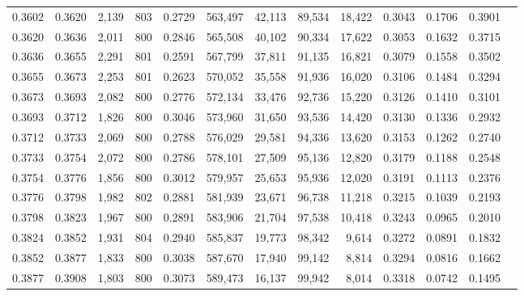 \begin{tabular}{rrrrrrrrrrrrr}
0.3602 & 0.3620 &  2,139 & 803 &                                     0.2729 & 563,497 &  42,113 &  89,534 &  18,422 & 0.3043 & 0.1706 & 0.3901 \\
0.3620 & 0.3636 &  2,011 & 800 &                                     0.2846 & 565,508 &  40,102 &  90,334 &  17,622 & 0.3053 & 0.1632 & 0.3715 \\
0.3636 & 0.3655 &  2,291 & 801 &                                     0.2591 & 567,799 &  37,811 &  91,135 &  16,821 & 0.3079 & 0.1558 & 0.3502 \\
0.3655 & 0.3673 &  2,253 & 801 &                                     0.2623 & 570,052 &  35,558 &  91,936 &  16,020 & 0.3106 & 0.1484 & 0.3294 \\
0.3673 & 0.3693 &  2,082 & 800 &                                     0.2776 & 572,134 &  33,476 &  92,736 &  15,220 & 0.3126 & 0.1410 & 0.3101 \\
0.3693 & 0.3712 &  1,826 & 800 &                                     0.3046 & 573,960 &  31,650 &  93,536 &  14,420 & 0.3130 & 0.1336 & 0.2932 \\
0.3712 & 0.3733 &  2,069 & 800 &                                     0.2788 & 576,029 &  29,581 &  94,336 &  13,620 & 0.3153 & 0.1262 & 0.2740 \\
0.3733 & 0.3754 &  2,072 & 800 &                                     0.2786 & 578,101 &  27,509 &  95,136 &  12,820 & 0.3179 & 0.1188 & 0.2548 \\
0.3754 & 0.3776 &  1,856 & 800 &                                     0.3012 & 579,957 &  25,653 &  95,936 &  12,020 & 0.3191 & 0.1113 & 0.2376 \\
0.3776 & 0.3798 &  1,982 & 802 &                                     0.2881 & 581,939 &  23,671 &  96,738 &  11,218 & 0.3215 & 0.1039 & 0.2193 \\
0.3798 & 0.3823 &  1,967 & 800 &                                     0.2891 & 583,906 &  21,704 &  97,538 &  10,418 & 0.3243 & 0.0965 & 0.2010 \\
0.3824 & 0.3852 &  1,931 & 804 &                                     0.2940 & 585,837 &  19,773 &  98,342 &   9,614 & 0.3272 & 0.0891 & 0.1832 \\
0.3852 & 0.3877 &  1,833 & 800 &                                     0.3038 & 587,670 &  17,940 &  99,142 &   8,814 & 0.3294 & 0.0816 & 0.1662 \\
0.3877 & 0.3908 &  1,803 & 800 &                                     0.3073 & 589,473 &  16,137 &  99,942 &   8,014 & 0.3318 & 0.0742 & 0.1495 \\

\end{tabular}
